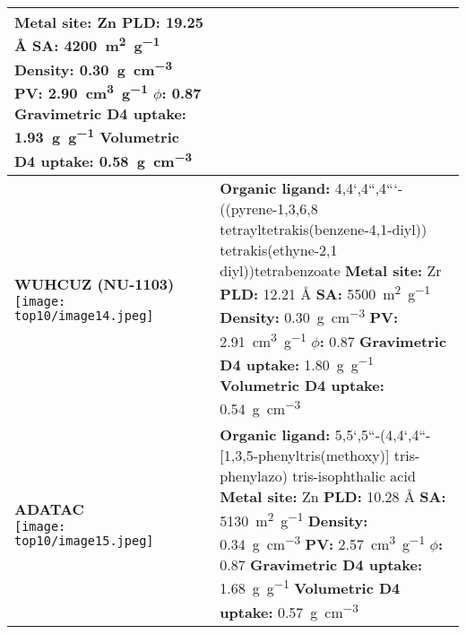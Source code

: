 {\begin{longtable}[]{@{}p{5cm}p{12cm}@{}}
{        \textbf{Metal site:} Zn \\
        \textbf{PLD:} 19.25 Å \\
        \textbf{SA:} \SI{4200}{\metre\squared\per\gram} \\
        \textbf{Density:} \SI{0.30}{\gram\per\centi\metre\cubed} \\
        \textbf{PV:} \SI{2.90}{\centi\metre\cubed\per\gram} \\
        \textbf{\(\phi\):} 0.87 \\
        \textbf{Gravimetric D4 uptake:} \SI{1.93}{\gram\per\gram} \\
        \textbf{Volumetric D4 uptake:} \SI{0.58}{\gram\per\centi\metre\cubed}}\\
    \midrule
    \makecell{\textbf{WUHCUZ (NU-1103)} \\ \texttt{[image: top10/image14.jpeg]}}
    & \makecell[l]{
        \textbf{Organic ligand:} \\
        {\tiny 4,4`,4``,4```-((pyrene-1,3,6,8 tetrayltetrakis(benzene-4,1-diyl)) tetrakis(ethyne-2,1 diyl))tetrabenzoate} \\
        \textbf{Metal site:} Zr \\
        \textbf{PLD:} 12.21 Å \\
        \textbf{SA:} \SI{5500}{\metre\squared\per\gram} \\
        \textbf{Density:} \SI{0.30}{\gram\per\centi\metre\cubed} \\
        \textbf{PV:} \SI{2.91}{\centi\metre\cubed\per\gram} \\
        \textbf{\(\phi\):} 0.87 \\
        \textbf{Gravimetric D4 uptake:} \SI{1.80}{\gram\per\gram} \\
        \textbf{Volumetric D4 uptake:} \SI{0.54}{\gram\per\centi\metre\cubed}}\\
    \midrule
    \makecell{\textbf{ADATAC} \\ \texttt{[image: top10/image15.jpeg]}}
    & \makecell[l]{
        \textbf{Organic ligand:} \\
        5,5`,5``-(4,4`,4``-{[}1,3,5-phenyltris(methoxy){]} tris-phenylazo) tris-isophthalic acid \\
        \textbf{Metal site:} Zn \\
        \textbf{PLD:} 10.28 Å \\
        \textbf{SA:} \SI{5130}{\metre\squared\per\gram} \\
        \textbf{Density:} \SI{0.34}{\gram\per\centi\metre\cubed} \\
        \textbf{PV:} \SI{2.57}{\centi\metre\cubed\per\gram} \\
        \textbf{\(\phi\):} 0.87 \\
        \textbf{Gravimetric D4 uptake:} \SI{1.68}{\gram\per\gram} \\
        \textbf{Volumetric D4 uptake:} \SI{0.57}{\gram\per\centi\metre\cubed}}\\
    \bottomrule
\end{longtable}
}

